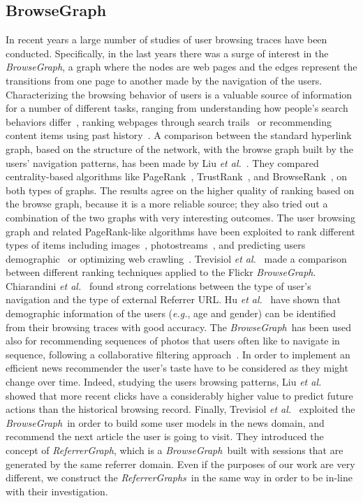 \documentclass{sig-alternate-2013}
\newcommand{\eg}{\emph{e.g.}}
\newcommand{\etal}{\emph{et al.}}
\newcommand{\rgraph}{\textit{ReferrerGraph}}
\newcommand{\rgraphs}{\textit{ReferrerGraphs}}
\newcommand{\bgraph}{\textit{BrowseGraph}}
\begin{document}
\subsection*{BrowseGraph}
In recent years a large number of studies of user browsing traces have been
conducted. Specifically, in the last years there was a surge of interest in the
\bgraph, a graph where the nodes are web pages and the edges
represent the transitions from one page to another made by the navigation of the
users. Characterizing the browsing behavior of users is a valuable source of
information for a number of different tasks, ranging from understanding how
people's search behaviors differ~\cite{White07investigatingbehavioral}, ranking
webpages through search trails~\cite{Agichtein:2006:IWS:1148170.1148177,
White:2010:ASR:1835449.1835548} or recommending content items using past
history~\cite{Tsagkias:2012:LIM:2348283.2348330}.
A comparison between the standard hyperlink graph, based on the structure of
the network, with the browse graph built by the users' navigation
patterns, has been made by Liu \etal~\cite{Liu2008a, Liu2009}. 
They compared centrality-based algorithms
like PageRank~\cite{Page1998}, TrustRank~\cite{Gyongyi2004}, and
BrowseRank~\cite{Liu2008a}, on both types of graphs. The results agree on the
higher quality of ranking based on the browse graph, because it is a more
reliable source; they also tried out a combination of the two graphs with very
interesting outcomes.
The user browsing graph and related PageRank-like algorithms have been exploited
to rank different types of items including
images~\cite{trevisiol12image,chiarandini12discovering},
photostreams~\cite{chiarandiniICWSM13}, 
and predicting users
demographic~\cite{hu07demographic} or optimizing web crawling~\cite{liu11user}.
Trevisiol \etal~\cite{trevisiol12image} made a comparison between different
ranking techniques applied to the Flickr \bgraph.
Chiarandini \etal~\cite{chiarandini12discovering} found strong correlations between the type of user's navigation and the type of external Referrer URL.
Hu \etal~\cite{hu07demographic} have shown that demographic information of the users (\eg, age and gender) can be identified from their browsing traces with good accuracy.
The \bgraph\ has been used also for recommending sequences of photos that users often like to navigate in sequence, following a collaborative filtering approach~\cite{chiarandiniICWSM13}.
In order to implement an efficient news recommender the user's taste have to be considered as they might change over time. Indeed, studying the users browsing patterns, Liu \etal~\cite{liu10personalized} showed that more recent clicks have a considerably higher value to predict future actions than the historical browsing record. 
Finally, Trevisiol \etal~\cite{TrevisiolRecSys14} exploited the \bgraph\ in order to build some user models in the news domain, and recommend the next article the user is going to visit. They introduced the concept of \rgraph, which is a \bgraph\ built with sessions that are generated by the same referrer domain. 
Even if the purposes of our work are very different, we construct the \rgraphs\ in the same way in order to be in-line with their investigation. 
\end{document}
